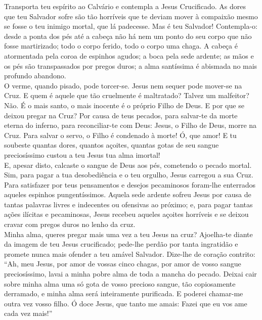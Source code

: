 \begin{flushleft}
    Transporta teu espírito ao Calvário e contempla a Jesus Crucificado. As dores que teu Salvador sofre são tão horríveis que te deviam mover à compaixão mesmo se fosse o teu inimigo mortal, que lá padecesse. Mas é teu Salvador! Contempla-o: desde a ponta dos pés até a cabeça não há nem um ponto do seu corpo que não fosse martirizado; todo o corpo ferido, todo o corpo uma chaga. A cabeça é atormentada pela coroa de espinhos agudos; a boca pela sede ardente; as mãos e os pés são transpassados por pregos duros; a alma santíssima é abismada no mais profundo abandono.
    \vspace{.2cm} \\
    O verme, quando pisado, pode torcer-se. Jesus nem sequer pode mover-se na Cruz. E quem é aquele que tão cruelmente é maltratado? Talvez um malfeitor? Não. É o mais santo, o mais inocente é o próprio Filho de Deus. E por que se deixou pregar na Cruz? Por causa de teus pecados, para salvar-te da morte eterna do inferno, para reconciliar-te com Deus: Jesus, o Filho de Deus, morre na Cruz. Para salvar o servo, o Filho é condenado à morte! Ó, que amor! E tu soubeste quantas dores, quantos açoites, quantas gotas de seu sangue preciosíssimo custou a teu Jesus tua alma imortal!
    \vspace{.2cm} \\
    E, apesar disto, calcaste o sangue de Deus aos pés, cometendo o pecado mortal. Sim, para pagar a tua desobediência e o teu orgulho, Jesus carregou a sua Cruz. Para satisfazer por teus pensamentos e desejos pecaminosos foram-lhe enterrados aqueles espinhos pungentíssimos. Aquela sede ardente sofreu Jesus por causa de tantas palavras livres e indecentes ou ofensivas ao próximo; e, para pagar tantas ações ilícitas e pecaminosas, Jesus recebeu aqueles açoites horríveis e se deixou cravar com pregos duros no lenho da cruz.
    \vspace{.2cm} \\
    Minha alma, queres pregar mais uma vez a teu Jesus na cruz? Ajoelha-te diante da imagem de teu Jesus crucificado; pede-lhe perdão por tanta ingratidão e promete nunca mais ofender a teu amável Salvador. Dize-lhe de coração contrito: ``Ah, meu Jesus, por amor de vossas cinco chagas, por amor de vosso sangue preciosíssimo, lavai a minha pobre alma de toda a mancha do pecado. Deixai cair sobre minha alma uma só gota de vosso precioso sangue, tão copiosamente derramado, e minha alma será inteiramente purificada. E poderei chamar-me outra vez vosso filho. Ó doce Jesus, que tanto me amais: Fazei que eu vos ame cada vez mais!''
\end{flushleft}
